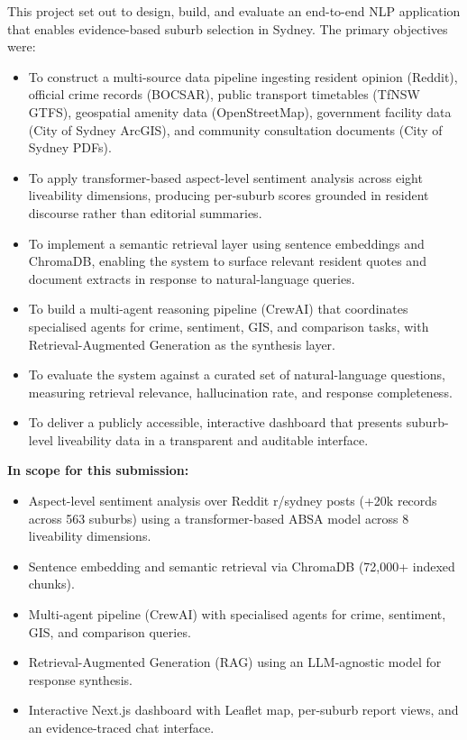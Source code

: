 \documentclass[11pt,a4paper]{article}
\providecommand{\tightlist}{%
  \setlength{\itemsep}{0pt}\setlength{\parskip}{0pt}}
\begin{document}
This project set out to design, build, and evaluate an end-to-end NLP application that enables evidence-based suburb selection in Sydney. The primary objectives were:

\begin{itemize}
\item To construct a multi-source data pipeline ingesting resident opinion (Reddit), official crime records (BOCSAR), public transport timetables (TfNSW GTFS), geospatial amenity data (OpenStreetMap), government facility data (City of Sydney ArcGIS), and community consultation documents (City of Sydney PDFs).
\item To apply transformer-based aspect-level sentiment analysis across eight liveability dimensions, producing per-suburb scores grounded in resident discourse rather than editorial summaries.
\item To implement a semantic retrieval layer using sentence embeddings and ChromaDB, enabling the system to surface relevant resident quotes and document extracts in response to natural-language queries.
\item To build a multi-agent reasoning pipeline (CrewAI) that coordinates specialised agents for crime, sentiment, GIS, and comparison tasks, with Retrieval-Augmented Generation as the synthesis layer.
\item To evaluate the system against a curated set of natural-language questions, measuring retrieval relevance, hallucination rate, and response completeness.
\item To deliver a publicly accessible, interactive dashboard that presents suburb-level liveability data in a transparent and auditable interface.
\end{itemize}

\textbf{In scope for this submission:}

\begin{itemize}
\tightlist
\item
  Aspect-level sentiment analysis over Reddit r/sydney posts (+20k records across 563 suburbs) using a transformer-based ABSA model across 8 liveability dimensions.
\item
  Sentence embedding and semantic retrieval via ChromaDB (72,000+ indexed chunks).
\item
  Multi-agent pipeline (CrewAI) with specialised agents for crime, sentiment, GIS, and comparison queries.
\item
  Retrieval-Augmented Generation (RAG) using an LLM-agnostic model for response synthesis.
\item
  Interactive Next.js dashboard with Leaflet map, per-suburb report views, and an evidence-traced chat interface.
\end{itemize}
\end{document}

